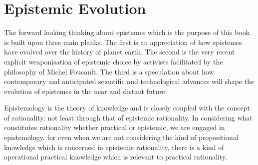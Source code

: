 \chapter{Epistemic Evolution}\label{EpistemicEvolution}

The forward looking thinking about epistemes which is the purpose of this book is built upon three main planks.
The first is an appreciation of how epistemes have evolved over the history of planet earth.
The second is the very recent explicit weaponisation of epistemic choice by activists facilitated by the philosophy of Michel Foucault.
The third is a speculation about how contemporary and anticipated scientific and technological advances will shape the evolution of epistemes in the near and distant future.

Epistemology is the theory of knowledge and is closely coupled with the concept of rationality, not least through that of epistemic rationality.
In considering what constitutes rationality whether practical or epistemic, we are engaged in epistemology, for even when we are not considering the kind of propositional knowledge which is concerned in epistemic rationality, there is a kind of operational practical knowledge which is relevant to practical rationality.
